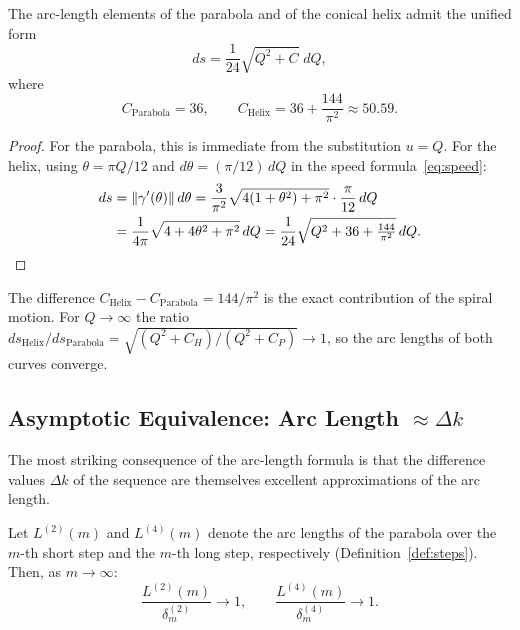 \begin{theorem}\label{thm:Q-arc}
The arc-length elements of the parabola and of the conical helix
admit the unified form
\begin{equation}\label{eq:ds-Q}
  ds = \frac{1}{24}\sqrt{Q^2 + C}\; dQ,
\end{equation}
where
\[
  C_{\mathrm{Parabola}} = 36,
  \qquad
  C_{\mathrm{Helix}} = 36 + \frac{144}{\pi^2} \approx 50.59.
\]
\end{theorem}

\begin{proof}
For the parabola, this is immediate from the substitution $u = Q$.
For the helix, using $\theta = \pi Q/12$ and $d\theta = (\pi/12)\,dQ$
in the speed formula~\eqref{eq:speed}:
\begin{align*}
  ds &= \|\gamma'(\theta)\|\,d\theta
     = \frac{3}{\pi^2}\sqrt{4(1+\theta^2)+\pi^2}\cdot\frac{\pi}{12}\,dQ \\
     &= \frac{1}{4\pi}\sqrt{4+4\theta^2+\pi^2}\,dQ
     = \frac{1}{24}\sqrt{Q^2 + 36 + \tfrac{144}{\pi^2}}\,dQ.
     \qedhere
\end{align*}
\end{proof}

\begin{remark}
The difference $C_{\mathrm{Helix}} - C_{\mathrm{Parabola}} = 144/\pi^2$
is the exact contribution of the spiral motion. For $Q \to \infty$ the
ratio
$ds_{\mathrm{Helix}}/ds_{\mathrm{Parabola}} = \sqrt{(Q^2+C_H)/(Q^2+C_P)}
\to 1$, so the arc lengths of both curves converge.
\end{remark}

\subsection{Asymptotic Equivalence: Arc Length \texorpdfstring{$\approx \Delta k$}{≈ Δk}}

The most striking consequence of the arc-length formula is that the
difference values $\Delta k$ of the sequence are themselves excellent
approximations of the arc length.

\begin{proposition}
\label{prop:asymptotic}
Let $L^{(2)}(m)$ and $L^{(4)}(m)$ denote the arc lengths of the
parabola over the $m$-th short step and the $m$-th long step,
respectively (Definition~\ref{def:steps}). Then, as $m \to \infty$:
\[
  \frac{L^{(2)}(m)}{\delta^{(2)}_m} \to 1,
  \qquad
  \frac{L^{(4)}(m)}{\delta^{(4)}_m} \to 1.
\]
\end{proposition}

